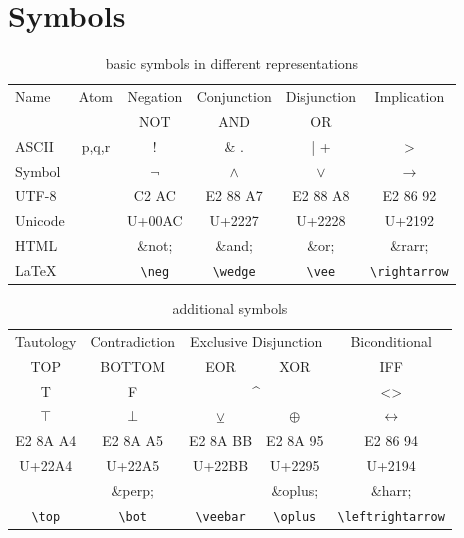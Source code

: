 




\chapter{Symbols}

\begin{table}[htdp]
\begin{center}
\begin{tabular}{lccccc}
Name	& Atom 	& Negation		& Conjunction		& Disjunction		&  Implication \\
		&  		& NOT		& AND		& OR		&   \\
ASCII 	& p,q,r 	& ! 			& \& \quad .	& |  \quad +			&> 	\\
Symbol  	&		& $\neg$		& $\wedge$	& {$\vee$}		&$\rightarrow$ \\ 
UTF-8	&		& C2 AC		& E2 88 A7	& {E2 88 A8}	&E2 86 92\\
Unicode	&		& U+00AC 	& U+2227		& {U+2228}	&U+2192\\
HTML	&		& \&not;		& \&and;		& \&or;		& \&rarr;  \\
LaTeX	&		& \verb+\neg+	& \verb+\wedge+ & \verb+\vee+ & \verb+\rightarrow+ \\

\end{tabular}
\caption{basic symbols in different representations}
\end{center}
\label{tab:BASICSYMBOLS}
\end{table}%

\begin{table}[htdp]
\begin{center}
\begin{tabular}{ccccc}
Tautology		& Contradiction		& \multicolumn{2}{c}{Exclusive Disjunction}	& Biconditional \\	
TOP			& BOTTOM		& EOR & XOR							& IFF \\
T \quad 1		& F  \quad 0		& \multicolumn{2}{c}{\textasciicircum} 		& <> \\
$\top$		& $\bot$			& $\veebar$ 							&$\oplus$   			&$ \leftrightarrow$\\
E2 8A A4		& E2 8A A5		& E2 8A BB							& E2 8A 95			&E2 86 94\\
U+22A4		& U+22A5			& U+22BB							& U+2295				&U+2194\\
			& \&perp;			&									& \&oplus;				& \&harr;\\
\verb+\top+	& \verb+\bot+	& \verb+\veebar+ & \verb+\oplus+	& \verb+\leftrightarrow+
\end{tabular}
\caption{additional symbols}
\label{tab:ADDITIONALSYMBOLS}
\end{center}
\end{table}%



